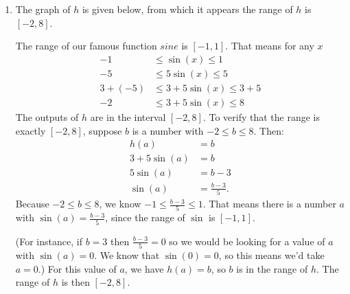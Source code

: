 \documentclass[nooutcomes]{ximera}
\begin{document}
\begin{example}
\begin{explanation}
\begin{enumerate}
				\item The graph of $h$ is given below, from which it appears the range of $h$ is $[-2, 8]$.
				
					\begin{image}
					\end{image}
				
				The range of our famous function $sine$ is $[-1, 1]$. That means for any $x$
					\begin{align*}
						-1 &\leq \sin(x) \leq 1\\
						-5 &\leq 5\sin(x) \leq 5\\
						3+(-5) &\leq 3+5\sin(x) \leq 3+5\\
						-2 &\leq 3+5\sin(x) \leq 8
					\end{align*}
					The outputs of $h$ are in the interval $[-2, 8]$. To verify that the range is exactly $[-2, 8]$, suppose 
					$b$ is a number with $-2 \leq b \leq 8$. Then:
					\begin{align*}
						h(a) &= b\\
						3 + 5\sin(a) &= b\\
						5\sin(a)& = b-3\\
						\sin(a) &= \frac{b-3}{5}.
					\end{align*}
					Because $-2 \leq b \leq 8$, we know $-1 \leq \frac{b-3}{5} \leq 1$. That means there is a number $a$ with $\sin(a) = \frac{b-3}{5}$, since the range of 
					$\sin$ is $[-1,1]$.
					
					(For instance, if $b=3$ then $\frac{b-3}{5} = 0$ so we would be looking for a value of $a$ with $\sin(a) = 0$. We know that $\sin(0) = 0$, so this means we'd take $a=0$.)
					For this value of $a$, we have $h(a) = b$, so $b$ is in the range of $h$. The range of $h$ is then $[-2, 8]$.
			\end{enumerate}
		\end{explanation}
	\end{example}
\end{document}
